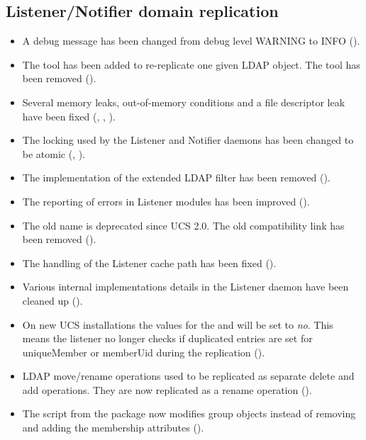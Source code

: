 \subsection{Listener/Notifier domain replication}
\begin{itemize}
\item A debug message has been changed from debug level WARNING to
  INFO ().
\item The tool  has been added to
  re-replicate one given LDAP object. The tool
   has been removed
  ().
\item Several memory leaks, out-of-memory conditions and a file
  descriptor leak have been fixed (, ,
  ).
\item The locking used by the Listener and Notifier daemons has been
  changed to be atomic (, ).
\item The implementation of the extended LDAP filter has been removed
  ().
\item The reporting of errors in Listener modules has been improved
  ().
\item The old name  is deprecated
  since UCS 2.0. The old compatibility link has been removed
  ().
\item The handling of the Listener cache path has been fixed
  ().
\item Various internal implementations details in the Listener daemon
  have been cleaned up ().

\item On new UCS installations the values for the
 and
 will be set to \emph{no}. This
means the listener no longer checks if duplicated entries are set for
uniqueMember or memberUid during the replication ().

\item LDAP move/rename operations used to be replicated as separate
  delete and add operations. They are now replicated as a rename operation
  ().
\item The script  from the
   package  now modifies
  group objects instead of removing and adding the membership
  attributes ().
\end{itemize}

